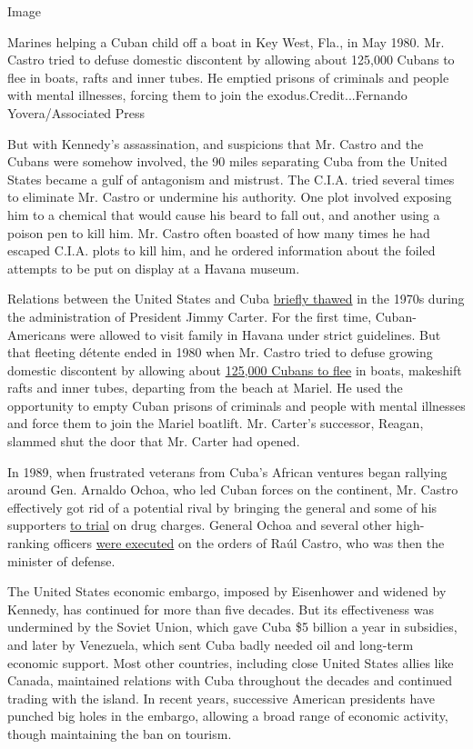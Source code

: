 Image

Marines helping a Cuban child off a boat in Key West, Fla., in May 1980.
Mr. Castro tried to defuse domestic discontent by allowing about 125,000
Cubans to flee in boats, rafts and inner tubes. He emptied prisons of
criminals and people with mental illnesses, forcing them to join the
exodus.Credit...Fernando Yovera/Associated Press

But with Kennedy's assassination, and suspicions that Mr. Castro and the
Cubans were somehow involved, the 90 miles separating Cuba from the
United States became a gulf of antagonism and mistrust. The C.I.A. tried
several times to eliminate Mr. Castro or undermine his authority. One
plot involved exposing him to a chemical that would cause his beard to
fall out, and another using a poison pen to kill him. Mr. Castro often
boasted of how many times he had escaped C.I.A. plots to kill him, and
he ordered information about the foiled attempts to be put on display at
a Havana museum.

Relations between the United States and Cuba
\href{http://query.nytimes.com/gst/abstract.html?res=9C07E1D61139E334BC4953DFB066838C669EDE}{briefly
thawed} in the 1970s during the administration of President Jimmy
Carter. For the first time, Cuban-Americans were allowed to visit family
in Havana under strict guidelines. But that fleeting détente ended in
1980 when Mr. Castro tried to defuse growing domestic discontent by
allowing about
\href{http://www.history.com/this-day-in-history/castro-announces-mariel-boatlift}{125,000
Cubans to flee} in boats, makeshift rafts and inner tubes, departing
from the beach at Mariel. He used the opportunity to empty Cuban prisons
of criminals and people with mental illnesses and force them to join the
Mariel boatlift. Mr. Carter's successor, Reagan, slammed shut the door
that Mr. Carter had opened.

In 1989, when frustrated veterans from Cuba's African ventures began
rallying around Gen. Arnaldo Ochoa, who led Cuban forces on the
continent, Mr. Castro effectively got rid of a potential rival by
bringing the general and some of his supporters
\href{http://www.nytimes.com/1989/06/27/world/raul-castro-adds-sparks-to-cuban-trial.html}{to
trial} on drug charges. General Ochoa and several other high-ranking
officers
\href{http://www.nytimes.com/1989/07/14/world/cuban-general-and-three-others-executed-for-sending-drugs-to-us.html}{were
executed} on the orders of Raúl Castro, who was then the minister of
defense.

The United States economic embargo, imposed by Eisenhower and widened by
Kennedy, has continued for more than five decades. But its effectiveness
was undermined by the Soviet Union, which gave Cuba \$5 billion a year
in subsidies, and later by Venezuela, which sent Cuba badly needed oil
and long-term economic support. Most other countries, including close
United States allies like Canada, maintained relations with Cuba
throughout the decades and continued trading with the island. In recent
years, successive American presidents have punched big holes in the
embargo, allowing a broad range of economic activity, though maintaining
the ban on tourism.

